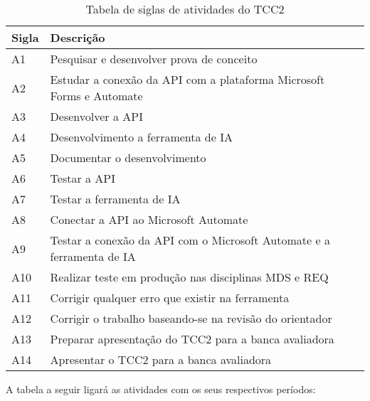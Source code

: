 \begin{table}[!ht]
\centering
\begin{tabularx}{\textwidth}{|X|X|}
\hline
\textbf{Sigla} & \textbf{Descrição} \\
\hline
A1 & Pesquisar e desenvolver prova de conceito \\ \hline
A2 & Estudar a conexão da API com a plataforma Microsoft Forms e Automate \\\hline
A3 & Desenvolver a API \\\hline
A4 & Desenvolvimento a ferramenta de IA \\\hline
A5 & Documentar o desenvolvimento \\\hline
A6 & Testar a API \\\hline
A7 & Testar a ferramenta de IA \\\hline
A8 & Conectar a API ao Microsoft Automate \\\hline
A9 & Testar a conexão da API com o Microsoft Automate e a ferramenta de IA \\\hline
A10 & Realizar teste em produção nas disciplinas MDS e REQ \\\hline
A11 & Corrigir qualquer erro que existir na ferramenta \\\hline
A12 & Corrigir o trabalho baseando-se na revisão do orientador \\\hline
A13 & Preparar apresentação do TCC2 para a banca avaliadora \\\hline
A14 & Apresentar o TCC2 para a banca avaliadora \\\hline
\end{tabularx}
\caption{Tabela de siglas de atividades do TCC2}
\end{table}

\pagebreak

A tabela a seguir ligará as atividades com os seus respectivos períodos:


